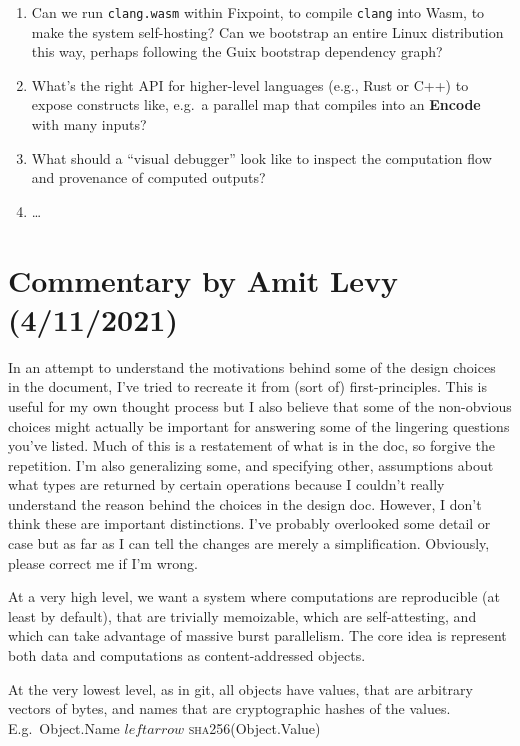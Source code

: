 \documentclass{article}
\newcommand{\encode}{\textbf{Encode}\xspace}
\newcommand{\bs}{\vspace{\baselineskip}}
\begin{document}
\begin{enumerate}[itemsep=0pt]
\item Can we run \texttt{clang.wasm} within Fixpoint, to compile
  \texttt{clang} into Wasm, to make the system self-hosting? Can we bootstrap an entire Linux distribution
  this way, perhaps following the Guix bootstrap dependency graph?

\item What's the right API for higher-level languages (e.g., Rust or C++) to expose constructs like, e.g.~a parallel map that compiles into an \encode with many inputs?

\item What should a ``visual debugger'' look like to inspect the computation flow and provenance of computed outputs?
  
\item \ldots
  
\end{enumerate}

\section{Commentary by Amit Levy (4/11/2021)}

In an attempt to understand the motivations behind some of the design
choices in the document, I've tried to recreate it from (sort of)
first-principles. This is useful for my own thought process but I also
believe that some of the non-obvious choices might actually be
important for answering some of the lingering questions you've
listed. Much of this is a restatement of what is in the doc, so
forgive the repetition. I'm also generalizing some, and specifying
other, assumptions about what types are returned by certain operations
because I couldn't really understand the reason behind the choices in
the design doc. However, I don't think these are important
distinctions. I've probably overlooked some detail or case but as far
as I can tell the changes are merely a simplification. Obviously,
please correct me if I'm wrong.

\bs

At a very high level, we want a system where computations are
reproducible (at least by default), that are trivially memoizable,
which are self-attesting, and which can take advantage of massive
burst parallelism. The core idea is represent both data and
computations as content-addressed objects.

\bs

At the very lowest level, as in git, all objects have values, that are
arbitrary vectors of bytes, and names that are cryptographic hashes of
the values. E.g.~Object.Name $leftarrow$ \textsc{sha256}(Object.Value)
\end{document}
